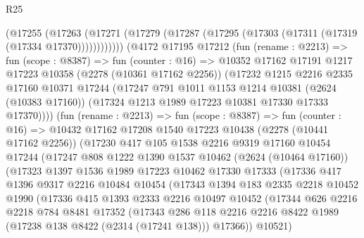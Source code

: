\begin{lexlean}{R25}
\begin{coremodule}
          (@17255
            (@17263
              (@17271 (@17279 (@17287 (@17295 (@17303 (@17311 (@17319 (@17334 @17370))))))))))))
      (@4172
        @17195
        @17212
        (fun (rename : @2213) =>
        fun (scope : @8387) =>
        fun (counter : @16) =>
        @10352
          @17162
          @17191
          @1217
          @17223
          @10358
          (@2278 (@10361 @17162 @2256))
          (@17232
            @1215
            @2216
            @2335
            @17160
            @10371
            @17244
            (@17247
              @791
              @1011
              @1153
              @1214
              @10381
              (@2624 (@10383 @17160))
              (@17324 @1213 @1989 @17223 @10381 @17330 @17333 @17370))))
        (fun (rename : @2213) =>
        fun (scope : @8387) =>
        fun (counter : @16) =>
        @10432
          @17162
          @17208
          @1540
          @17223
          @10438
          (@2278 (@10441 @17162 @2256))
          (@17230
            @417
            @105
            @1538
            @2216
            @9319
            @17160
            @10454
            @17244
            (@17247
              @808
              @1222
              @1390
              @1537
              @10462
              (@2624 (@10464 @17160))
              (@17323
                @1397
                @1536
                @1989
                @17223
                @10462
                @17330
                @17333
                (@17336
                  @417
                  @1396
                  @9317
                  @2216
                  @10484
                  @10454
                  (@17343
                    @1394
                    @183
                    @2335
                    @2218
                    @10452
                    @1990
                    (@17336
                      @415
                      @1393
                      @2333
                      @2216
                      @10497
                      @10452
                      (@17344
                        @626
                        @2216
                        @2218
                        @784
                        @8481
                        @17352
                        (@17343
                          @286
                          @118
                          @2216
                          @2216
                          @8422
                          @1989
                          (@17238 @138 @8422 (@2314 (@17241 @138)))
                          @17366))
                      @10521)

\end{coremodule}
\end{lexlean}
